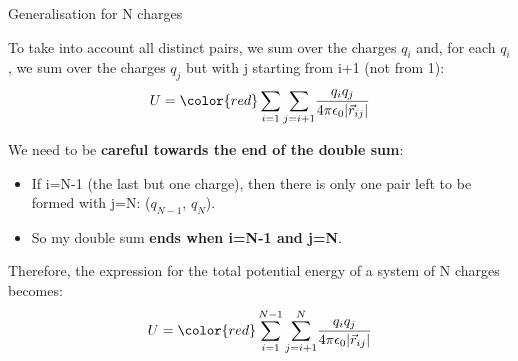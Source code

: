 \begin{frame}{Generalisation for N charges}

To take into account all distinct pairs, we sum over the charges $q_i$ and, for each $q_i$,
we sum over the charges $q_j$ but with j starting from i+1 (not from 1):
\begin{equation*}
     U = {\color{red} \sum_{i=1} \sum_{j=i+1} } \frac{q_i q_j}{4\pi\epsilon_0 |\vec{r}_{ij}|}
\end{equation*}

\vspace{0.2cm}

We need to be {\bf careful towards the end of the double sum}:
\begin{itemize}
     \item If i=N-1 (the last but one charge), then there is only one pair
           left to be formed with j=N: {\color{red} ($q_{N-1}$, $q_N$)}.
     \item So my double sum {\bf ends when i=N-1 and j=N}.
\end{itemize}

\vspace{0.2cm}

Therefore, the expression for the total potential energy of a system of N charges becomes:
\begin{equation*}
   U = {\color{red}\sum_{i=1}^{N-1} \sum_{j=i+1}^{N}} \frac{q_i q_j}{4\pi\epsilon_0|\vec{r}_{ij}|}
\end{equation*}

\end{frame}

%
%
%

